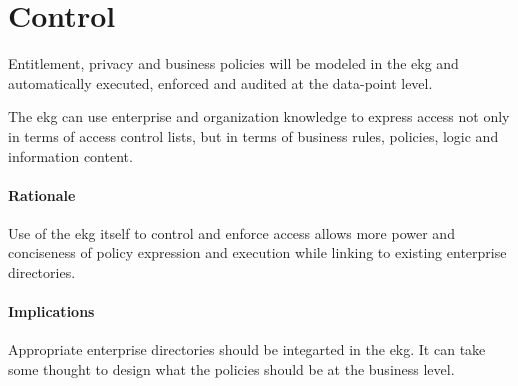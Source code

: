 \section{Control}\label{sec:ekg-principle-09-control.tex}

Entitlement, privacy and business policies will be modeled in the \gls{ekg} 
and automatically executed, enforced and audited at the \gls{data-point} level.

The \gls{ekg} can use enterprise and organization knowledge to express 
access not only in terms of access control lists, but in terms of 
business rules, policies, logic and information content. 

\paragraph{Rationale}

Use of the \gls{ekg} itself to control and enforce access allows 
more power and conciseness of policy expression and execution 
while linking to existing enterprise directories.

\paragraph{Implications}

Appropriate enterprise directories should be integarted in the \gls{ekg}.
It can take some thought to design what the policies should be at the business level.
